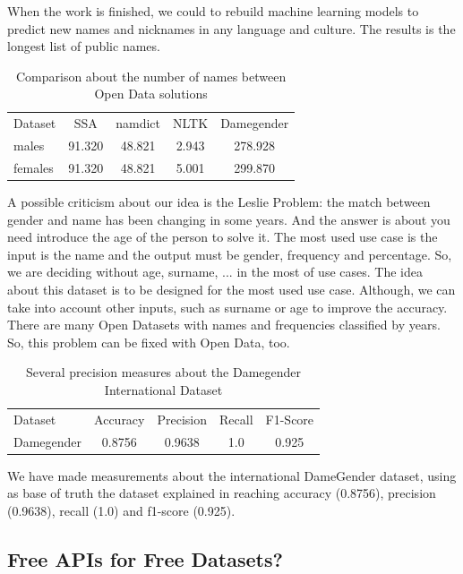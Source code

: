 \documentclass[a4paper]{article}
\begin{document}
When the work is finished, we could to rebuild machine learning models
to predict new names and nicknames in any language and culture. The
results is the longest list of public names.

\begin{table}[t]
\footnotesize
\begin{tabular}[]{lcccc}
  \hline
  Dataset & SSA & namdict & NLTK & Damegender \tabularnewline
  males & 91.320 & 48.821 & 2.943 & 278.928 \tabularnewline
  females & 91.320 & 48.821 & 5.001 & 299.870 \tabularnewline
  \hline
\end{tabular}
\caption{Comparison about the number of names between Open Data solutions}
\label{table:DifferentNamesMeasures}
\end{table}

A possible criticism about our idea is the Leslie
Problem\cite{blevins2015jane}: the match between gender and name has
been changing in some years. And the answer is about you need
introduce the age of the person to solve it. The most used use case is
the input is the name and the output must be gender, frequency and
percentage. So, we are deciding without age, surname, ... in the most
of use cases. The idea about this dataset is to be designed for the
most used use case. Although, we can take into account other inputs,
such as surname or age to improve the accuracy. There are many Open
Datasets with names and frequencies classified by years. So, this
problem can be fixed with Open Data, too.

\begin{table}[t]
\footnotesize
\begin{tabular}[]{lcccc}
  \hline
  Dataset  & Accuracy & Precision & Recall & F1-Score  \tabularnewline
  Damegender &  0.8756  & 0.9638    & 1.0    & 0.925  \tabularnewline
  \hline
\end{tabular}
\caption{Several precision measures about the Damegender International Dataset}
\label{table:DifferentAccuracyMeasures}
\end{table}

We have made measurements about the international DameGender dataset,
using as base of truth the dataset explained in
\cite{10.7717/peerj-cs.156} reaching accuracy (0.8756), precision
(0.9638), recall (1.0) and f1-score (0.925).

\subsection{Free APIs for Free Datasets?}
\label{sec:freeapis}
\end{document}
